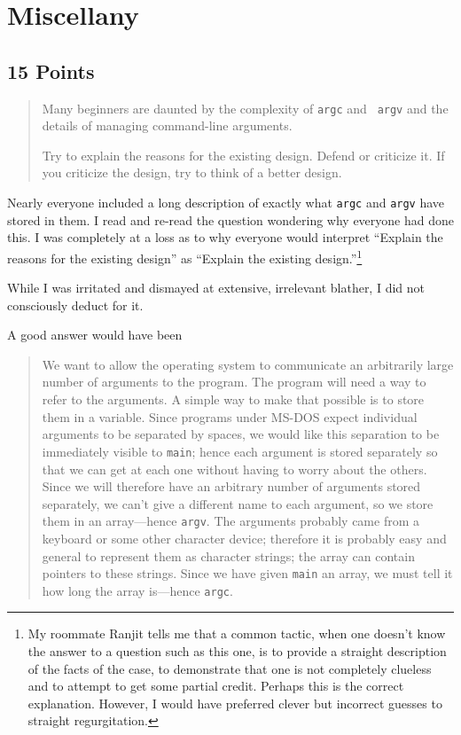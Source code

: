 \section{Miscellany}

\subsection{15 Points}

\begin{quotation}
\small
Many beginners are daunted by the complexity of {\tt argc} and {\tt
argv} and the details of managing command-line arguments.

Try to explain the reasons for the existing design.  Defend or criticize
it.  If you criticize the design, try to think of a better design.
\end{quotation}

Nearly everyone included a long description of exactly what {\tt argc}
and {\tt argv} have stored in them.  I read and re-read the question
wondering why everyone had done this.  I was completely at a loss as to
why everyone would interpret ``Explain the reasons for the existing
design'' as ``Explain the existing design.''\footnote{My roommate Ranjit
tells me that a common tactic, when one doesn't know the answer to a
question such as this one, is to provide a straight description of the
facts of the case, to demonstrate that one is not completely clueless
and to attempt to get some partial credit.  Perhaps this is the correct
explanation.  However, I would have preferred clever but incorrect
guesses to straight regurgitation.}

While I was irritated and dismayed at extensive, irrelevant blather, I
did not consciously deduct for it.

A good answer would have been

\begin{quotation}
\small
We want to allow the operating system to communicate an arbitrarily
large number of arguments to the program.  The program will need a way
to refer to the arguments. A simple way to make that possible is to
store them in a variable.  Since programs under MS-DOS expect individual
arguments to be separated by spaces, we would like this separation to be
immediately visible to {\tt main}; hence each argument is stored
separately so that we can get at each one without having to worry about
the others.  Since we will therefore have an arbitrary number of
arguments stored separately, we can't give a different name to each
argument, so we store them in an array---hence {\tt argv}.  The
arguments probably came from a keyboard or some other character device;
therefore it is probably easy and general to represent them as character
strings; the array can contain pointers to these strings.  Since we have
given {\tt main} an array, we must tell it how long the array is---hence
{\tt argc}.
\end{quotation}

